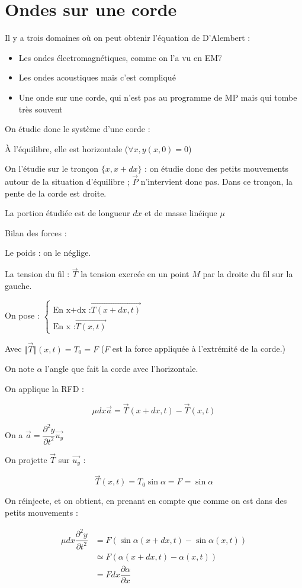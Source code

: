 \documentclass[a4paper,12pt]{book}
\renewcommand{\Vec}[1]{\overrightarrow{#1}}
\begin{document}
\section{Ondes sur une corde}
Il y a trois domaines où on peut obtenir l'équation de D'Alembert :\begin{itemize}
\item Les ondes électromagnétiques, comme on l'a vu en EM7
\item Les ondes acoustiques mais c'est compliqué
\item Une onde sur une corde, qui n'est pas au programme de MP mais qui tombe très souvent
\end{itemize}
On étudie donc le système d'une corde :
\par À l'équilibre, elle est horizontale ($\forall x,y(x,0) =0$)
\par On l'étudie sur le tronçon $\{x,x+dx\}$ : on étudie donc des petits mouvements autour de la situation d'équilibre ; $\Vec{P}$ n'intervient donc pas. Dans ce tronçon, la pente de la corde est droite.
\par La portion étudiée est de longueur $dx$ et de masse linéique $\mu$
\par Bilan des forces :
\par Le poids : on le néglige.
\par La tension du fil : $\Vec{T}$ la tension exercée en un point $M$ par la droite du fil sur la gauche.
\par On pose : $\begin{cases} \text{En x+dx :}\Vec{T(x+dx,t)} \\\text{En x :} \Vec{T(x,t)}\end{cases}$
\par Avec $\Vert\Vec{T}\Vert(x,t) = T_0 = F$ ($F$ est la force appliquée à l'extrémité de la corde.)
\par On note $\alpha$ l'angle que fait la corde avec l'horizontale.
\par On applique la RFD :
\par $$\mu dx\Vec{a} =\Vec{T}(x+dx,t)-\Vec{T}(x,t)$$
\par On a $\Vec{a} =\dfrac{\partial^2 y}{\partial t^2}\Vec{u_y}$
\par On projette $\Vec{T}$ sur $\vec{u_y}$ :
\par $$\Vec{T}(x,t) = T_0\sin\alpha =F=\sin\alpha$$
\par On réinjecte, et on obtient, en prenant en compte que comme on est dans des petits mouvements :
\par\begin{align*}\mu dx\dfrac{\partial^2y}{\partial t^2} &= F(\sin\alpha(x+dx,t) -\sin\alpha(x,t))\\
&\simeq F(\alpha(x+dx,t)-\alpha(x,t))\\
&=Fdx\dfrac{\partial \alpha}{\partial x}
\end{align*}
\end{document}

